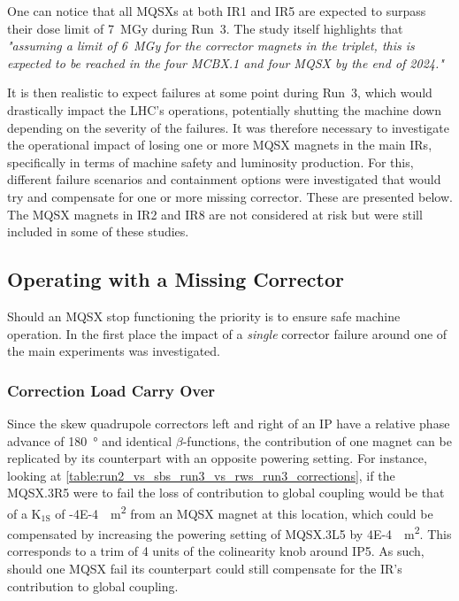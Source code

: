 One can notice that all MQSXs at both IR\num{1} and IR\num{5} are expected to surpass their dose limit of \qty{7}{\mega\gray} during Run~\num{3}.
The study itself highlights that \textit{"assuming a limit of \qty{6}{\mega\gray} for the corrector magnets in the triplet, this is expected to be reached in the four MCBX.1 and four MQSX by the end of 2024."}

It is then realistic to expect failures at some point during Run~\num{3}, which would drastically impact the LHC's operations, potentially shutting the machine down depending on the severity of the failures.
It was therefore necessary to investigate the operational impact of losing one or more MQSX magnets in the main IRs, specifically in terms of machine safety and luminosity production.
For this, different failure scenarios and containment options were investigated that would try and compensate for one or more missing corrector.
These are presented below.
The MQSX magnets in IR\num{2} and IR\num{8} are not considered at risk but were still included in some of these studies.

\subsection{Operating with a Missing Corrector}

Should an MQSX stop functioning the priority is to ensure safe machine operation.
In the first place the impact of a \textit{single} corrector failure around one of the main experiments was investigated.

\subsubsection*{Correction Load Carry Over}

Since the skew quadrupole correctors left and right of an IP have a relative phase advance of \qty{180}{\degree} and identical \(\beta\)-functions, the contribution of one magnet can be replicated by its counterpart with an opposite powering setting.
For instance, looking at \cref{table:run2_vs_sbs_run3_vs_rws_run3_corrections}, if the MQSX.\num{3}R\num{5} were to fail the loss of contribution to global coupling would be that of a \(\mathrm{K_{1S}}\) of \qty{-4E-4}{\per\square\meter} from an MQSX magnet at this location, which could be compensated by increasing the powering setting of MQSX.\num{3}L\num{5} by \qty{4E-4}{\per\square\meter}.
This corresponds to a trim of \num{4} units of the colinearity knob around IP\num{5}.
As such, should one MQSX fail its counterpart could still compensate for the IR's contribution to global coupling.

